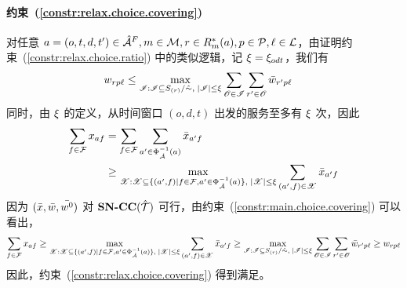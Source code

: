 \paragraph*{约束~(\ref{constr:relax.choice.covering})} 对任意 $a = (o,t,d,t') \in{\hat{\mathcal{A}}^F_{{}}}, m\in\mathcal{M}, r\in R^{*}_{m}(a), p\in\mathcal{P}, \ell\in\mathcal{L}$，由证明约束~(\ref{constr:relax.choice.ratio}) 中的类似逻辑，记 $\xi = \xi_{odt}$，我们有
\begin{equation*}
\begin{aligned}
    w_{rp\ell}
    & \le \max_{\mathscr{I}: \mathscr{I} \subseteq S_{(r)} /\hat{\sim},\; |\mathscr{I}| \le \xi} \sum_{\mathscr{O} \in \mathscr{I}} \sum_{r' \in \mathscr{O}} \bar{w}_{r'p\ell}
\end{aligned}
\end{equation*}
同时，由 $\xi$ 的定义，从时间窗口 $(o,d,t)$ 出发的服务至多有 $\xi$ 次，因此
\begin{equation*}
\begin{aligned}
    \sum_{f\in \mathcal{F}} x_{af}
    & = \sum_{f\in \mathcal{F}} \sum_{a^\prime\in\Phi_{\hat{\mathcal{A}}}^{-1}(a)} \bar{x}_{a^\prime f} \\
    & \ge \max_{\mathscr{X}: \mathscr{X} \subseteq \{(a',f)\mid f\in \mathcal{F}, a^\prime\in\Phi_{\hat{\mathcal{A}}}^{-1}(a)\},\; |\mathscr{X}| \le \xi} \sum_{(a',f) \in \mathscr{X}} \bar{x}_{a'f}
\end{aligned}
\end{equation*}
因为 $(\bar{x}, \bar{w}, \bar{{w^0}})$ 对 $\textbf{SN-CC}({\hat{\mathcal{T}}})$ 可行，由约束~(\ref{constr:main.choice.covering}) 可以看出，
\[
    \sum_{f\in \mathcal{F}} x_{af}
    \ge \max_{\mathscr{X}: \mathscr{X} \subseteq \{(a',f)\mid f\in \mathcal{F}, a^\prime\in\Phi_{\hat{\mathcal{A}}}^{-1}(a)\},\; |\mathscr{X}| \le \xi} \sum_{(a',f) \in \mathscr{X}} \bar{x}_{a'f}
    \ge \max_{\mathscr{I}: \mathscr{I} \subseteq S_{(r)} /\hat{\sim},\; |\mathscr{I}| \le \xi} \sum_{\mathscr{O} \in \mathscr{I}} \sum_{r' \in \mathscr{O}} \bar{w}_{r'p\ell}
    \ge w_{rp\ell}
\]
因此，约束~(\ref{constr:relax.choice.covering}) 得到满足。

